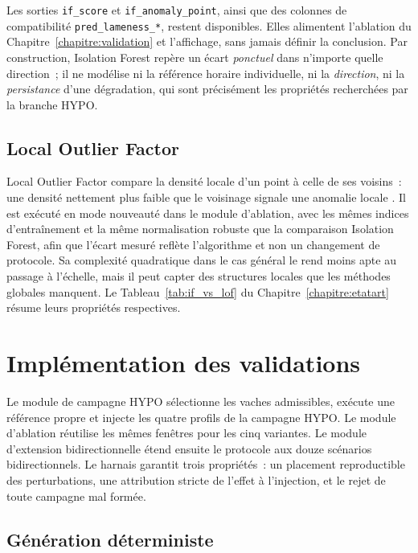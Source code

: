 Les sorties \texttt{if\_score} et \texttt{if\_anomaly\_point}, ainsi que des colonnes de
compatibilité \texttt{pred\_lameness\_*}, restent disponibles. Elles alimentent l'ablation
du Chapitre~\ref{chapitre:validation} et l'affichage, sans jamais définir la conclusion. Par
construction, Isolation Forest repère un écart \emph{ponctuel} dans n'importe quelle
direction~; il ne modélise ni la référence horaire individuelle, ni la \emph{direction}, ni
la \emph{persistance} d'une dégradation, qui sont précisément les propriétés recherchées par
la branche HYPO.

\subsection{Local Outlier Factor}

Local Outlier Factor compare la densité locale d'un point à celle de ses voisins~: une
densité nettement plus faible que le voisinage signale une anomalie locale
\citep{breunig2000lof}. Il est exécuté en mode nouveauté dans le module d'ablation,
avec les mêmes indices d'entraînement et la même normalisation robuste que la comparaison
Isolation Forest, afin que l'écart mesuré reflète l'algorithme et non un changement de
protocole. Sa complexité quadratique dans le cas général le rend moins apte au passage à
l'échelle, mais il peut capter des structures locales que les méthodes globales manquent.
Le Tableau~\ref{tab:if_vs_lof} du Chapitre~\ref{chapitre:etatart} résume leurs propriétés
respectives.

\section{Implémentation des validations}

Le module de campagne HYPO sélectionne les vaches admissibles, exécute une
référence propre et injecte les quatre profils de la campagne HYPO. Le module
d'ablation réutilise les mêmes fenêtres pour les cinq variantes. Le
module d'extension bidirectionnelle étend ensuite le protocole aux douze scénarios
bidirectionnels. Le harnais garantit trois propriétés~: un placement reproductible des
perturbations, une attribution stricte de l'effet à l'injection, et le rejet de toute
campagne mal formée.

\subsection{Génération déterministe}

